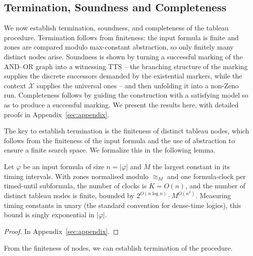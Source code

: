 
\subsection{Termination, Soundness and Completeness}\label{sec:proofs} 
We now establish termination, soundness, and completeness of the tableau procedure.
Termination follows from finiteness: the input formula is finite and zones are compared modulo max-constant abstraction, so only finitely many distinct nodes arise. Soundness is shown by turning a {successful marking} of the AND--OR graph into a witnessing TTS -- the branching structure of the marking supplies the discrete successors demanded by the existential markers, while the context $\mathcal{X}$ supplies the universal ones -- and then unfolding it into a non-Zeno run. Completeness follows by guiding the construction with a satisfying model so as to produce a successful marking. We present the results here, with detailed proofs in Appendix~\ref{sec:appendix}.

The key to establish termination is the finiteness of distinct tableau nodes, which follows from the finiteness of the input formula and the use of abstraction to ensure a finite search space. We formalize this in the following lemma.

\begin{lemma}\label{lem:finiteness}

Let $\varphi$ be an input formula of size $n=|\varphi|$ and $M$ the largest constant in its timing intervals. With zones normalised modulo $\cong_M$ and one formula-clock per timed-until subformula, the number of clocks is $K=O(n)$, and the number of distinct tableau nodes is finite, bounded by $2^{O(n\log n)}\cdot M^{O(n^2)}$. Measuring timing constants in unary (the standard convention for dense-time logics), this bound is singly exponential in $|\varphi|$.

\end{lemma}

\begin{proof}
    In Appendix~\ref{sec:appendix}.
\end{proof}

From the finiteness of nodes, we can establish termination of the procedure.

